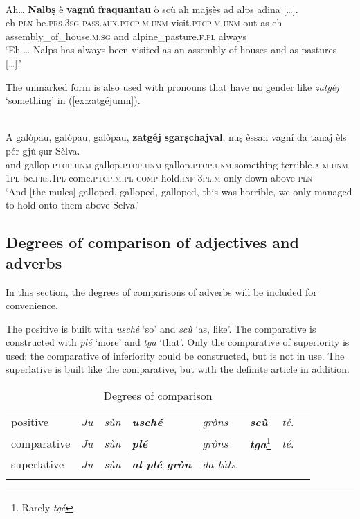 \ea\label{ex:ptcp.unm1}
\\
\gll  Ah… \textbf{Nalbṣ} è \textbf{vagnú} \textbf{fraquantau} ò scù ah majṣès ad alps adina […].  \\
eh \textsc{pln} be.\textsc{prs.3sg} \textsc{pass.aux.ptcp.m.unm} visit.\textsc{ptcp.m.unm} out as eh assembly\_of\_house.\textsc{m.sg} and alpine\_pasture.\textsc{f.pl} always\\
\glt `Eh … Nalps has always been visited as an assembly of houses and as pastures […].'
\z

The unmarked form is also used with pronouns that have no gender like \textit{zatgéj} `something' in (\ref{ex:zatgéjunm}).


\ea\label{ex:zatgéjunm}
\\
\gll  A galòpau, galòpau, galòpau, \textbf{zatgéj} \textbf{sgarṣchajval}, nuṣ èssan vagní da tanaj èls pér gjù ṣur Sèlva.  \\ 
and gallop.\textsc{ptcp.unm} gallop.\textsc{ptcp.unm} gallop.\textsc{ptcp.unm} something terrible.\textsc{adj.unm} \textsc{1pl} be.\textsc{prs.1pl} come.\textsc{ptcp.m.pl}   \textsc{comp} hold.\textsc{inf} \textsc{3pl.m} only down above \textsc{pln}  \\
\glt `And [the mules] galloped, galloped, galloped, this was horrible, we only managed to hold onto them above Selva.'
\z

\subsection{Degrees of comparison of adjectives and adverbs}
In this section, the degrees of comparisons of adverbs will be included for convenience.

The positive is built with \textit{usché} `so' and \textit{scù} `as, like'. The comparative is constructed with \textit{plé} `more' and \textit{tga} `that'. Only the comparative of superiority is used; the comparative of inferiority could be constructed, but is not in use. The superlative is built like the comparative, but with the definite article in addition.

\begin{table}
	\caption{Degrees of comparison}

\begin{tabular}{llllllll}
	\lsptoprule
	positive & \textit{Ju} & \textit{sùn} & \textbf{\textit{usché}} & \textit{gròns} & \textbf{\textit{scù}} & \textit{té}.\\
comparative & \textit{Ju} & \textit{sùn} & \textbf{\textit{plé}} & \textit{\textit{gròns}} & \textit{\textbf{tga}}\footnote{Rarely \textit{tgé}} & \textit{té}.\\
superlative & \textit{Ju} & \textit{sùn} & \textbf{\textit{al plé gròn}} & \textit{da tùts}.\\
	\lspbottomrule
\end{tabular}
\end{table}

